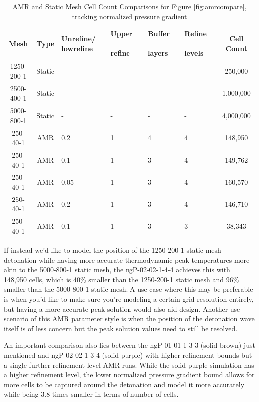 \begin{table}[h]
\centering
\caption{AMR and Static Mesh Cell Count Comparisons for Figure \ref{fig:amrcompare}, tracking normalized pressure gradient}
\label{tab:amrcompare}
\begin{tabular}{ccp{2cm}p{2cm}p{2cm}p{2cm}c}
Mesh & Type & Unrefine/ lowrefine & Upper ~~~ refine & Buffer ~~ layers & Refine ~~ levels& Cell Count \\ \hline
1250-200-1 & Static & - & - & - & - & 250,000 \\ 
2500-400-1 & Static & - & - & - & - & 1,000,000 \\
5000-800-1 & Static & - & - & - & - & 4,000,000 \\
250-40-1 & AMR & 0.2 & 1 & 4 & 4 & 148,950 \\
250-40-1 & AMR & 0.1 & 1 & 3 & 4 & 149,762 \\
250-40-1 & AMR & 0.05 & 1 & 3 & 4 & 160,570 \\ 
250-40-1 & AMR & 0.2 & 1 & 3 & 4 & 146,710 \\ 
250-40-1 & AMR & 0.1 & 1 & 3 & 3 & 38,343 \\ 
\end{tabular}
\end{table}

If instead we'd like to model the position of the 1250-200-1 static mesh detonation while having more accurate thermodynamic peak temperatures more akin to the 5000-800-1 static mesh, the ngP-02-02-1-4-4 achieves this with 148,950 cells, which is 40\% smaller than the 1250-200-1 static mesh and 96\% smaller than the 5000-800-1 static mesh. A use case where this may be preferable is when you'd like to make sure you're modeling a certain grid resolution entirely, but having a more accurate peak solution would also aid design. Another use scenario of this AMR parameter style is when the position of the detonation wave itself is of less concern but the peak solution values need to still be resolved. 

An important comparison also lies between the ngP-01-01-1-3-3 (solid brown) just mentioned and ngP-02-02-1-3-4 (solid purple) with higher refinement bounds but a single further refinement level AMR runs. While the solid purple simulation has a higher refinement level, the lower normalized pressure gradient bound allows for more cells to be captured around the detonation and model it more accurately while being 3.8 times smaller in terms of number of cells. 
